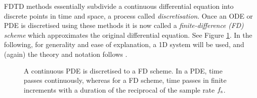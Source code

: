 
FDTD methods essentially subdivide a continuous differential equation into discrete points in time and space, a process called \textit{discretisation}. Once an ODE or PDE is discretised using these methods it is now called a \textit{finite-difference (FD) scheme} which approximates the original differential equation. See Figure \ref{fig:discretisation}. In the following, for generality and ease of explanation, a 1D system will be used, and (again) the theory and notation follows \cite{theBible}.

\begin{figure}[h]
    \centering
      \caption{A continuous PDE is discretised to a FD scheme. In a PDE, time passes continuously, whereas for a FD scheme, time passes in finite increments with a duration of the reciprocal of the sample rate $f_\text{s}$. \label{fig:discretisation}}
\end{figure}

